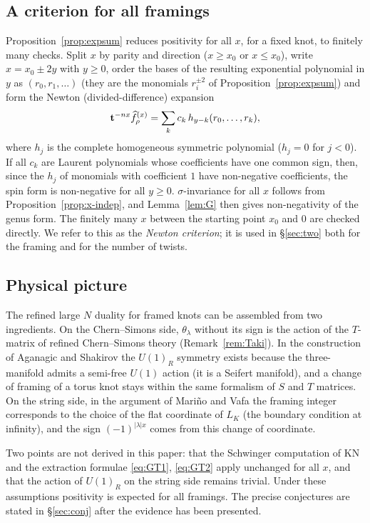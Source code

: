\subsection{A criterion for all framings}\label{sec:newton}
Proposition~\ref{prop:expsum} reduces positivity for all $x$, for a fixed knot, to finitely many checks.
Split $x$ by parity and direction ($x\ge x_0$ or $x\le x_0$), write $x=x_0\pm2y$ with $y\ge0$, order the bases of the resulting exponential polynomial in $y$ as $(r_0,r_1,\dots)$ (they are the monomials $r_i^{\pm2}$ of Proposition~\ref{prop:expsum}) and form the Newton (divided-difference) expansion
\[
\mathbf{t}^{-nx}\widehat{f}^{(x)}_\rho=\sum_{k}c_k\,h_{y-k}(r_0,\dots,r_k),
\]
where $h_j$ is the complete homogeneous symmetric polynomial ($h_j=0$ for $j<0$).
If all $c_k$ are Laurent polynomials whose coefficients have one common sign, then, since the $h_j$ of monomials with coefficient $1$ have non-negative coefficients,
the spin form is non-negative for all $y\ge0$.
$\sigma$-invariance for all $x$ follows from Proposition~\ref{prop:x-indep}, and Lemma~\ref{lem:G} then gives non-negativity of the genus form.
The finitely many $x$ between the starting point $x_0$ and $0$ are checked directly.
We refer to this as the \emph{Newton criterion}; it is used in \S\ref{sec:two} both for the framing and for the number of twists.

\subsection{Physical picture}\label{sec:physics}
The refined large $N$ duality for framed knots can be assembled from two ingredients.
On the Chern--Simons side, $\theta_\lambda$ without its sign is the action of the $T$-matrix of refined Chern--Simons theory (Remark~\ref{rem:Taki}).
In the construction of Aganagic and Shakirov the $U(1)_R$ symmetry exists because the three-manifold admits a semi-free $U(1)$ action (it is a Seifert manifold),
and a change of framing of a torus knot stays within the same formalism of $S$ and $T$ matrices.
On the string side, in the argument of Mari\~no and Vafa the framing integer corresponds to the choice of the flat coordinate of $L_K$ (the boundary condition at infinity), and the sign $(-1)^{|\lambda|x}$ comes from this change of coordinate.

Two points are not derived in this paper:
that the Schwinger computation of KN and the extraction formulae \eqref{eq:GT1}, \eqref{eq:GT2} apply unchanged for all $x$,
and that the action of $U(1)_R$ on the string side remains trivial.
Under these assumptions positivity is expected for all framings. The precise conjectures are stated in \S\ref{sec:conj} after the evidence has been presented.
